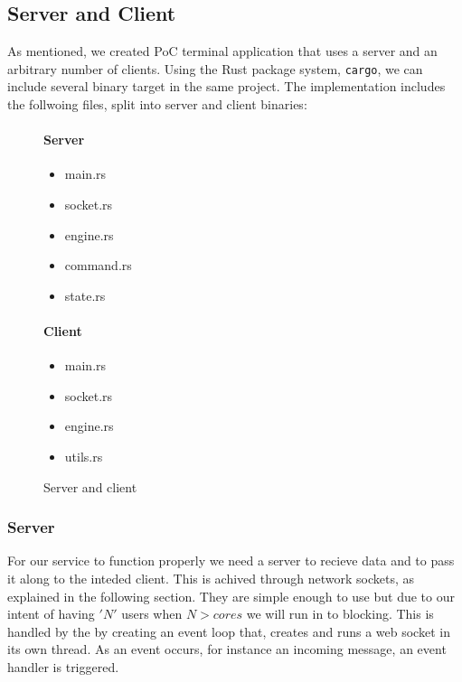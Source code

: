 \subsection{Server and Client}
As mentioned, we created PoC terminal application that uses a server
and an arbitrary number of clients. Using the Rust package system,
{\tt cargo}, we can include several binary target in the same
project. The implementation includes the follwoing files, split into
server and client binaries:
\begin{figure}[h]
  \begin{minipage}{0.5\textwidth}
    \paragraph{Server}
    \begin{itemize}
      \item main.rs
      \item socket.rs
      \item engine.rs
      \item command.rs
      \item state.rs
    \end{itemize}
  \end{minipage} \hfill
  \begin{minipage}{0.5\textwidth}
    \paragraph{Client}
    \begin{itemize}
      \item main.rs
      \item socket.rs
      \item engine.rs
      \item utils.rs
    \end{itemize}
  \end{minipage} \vfill
  \caption{Server and client}
\end{figure}

\subsubsection{Server}
For our service to function properly we need a server to recieve data
and to pass it along to the inteded client. This is achived through
network sockets, as explained in the following section. They are
simple enough to use but due to our intent of having $'N'$ users when
$N > cores$ we will run in to blocking. This is handled by the by
creating an event loop that, creates and runs a web socket in its own
thread. As an event occurs, for instance an incoming message, an event
handler is triggered.

